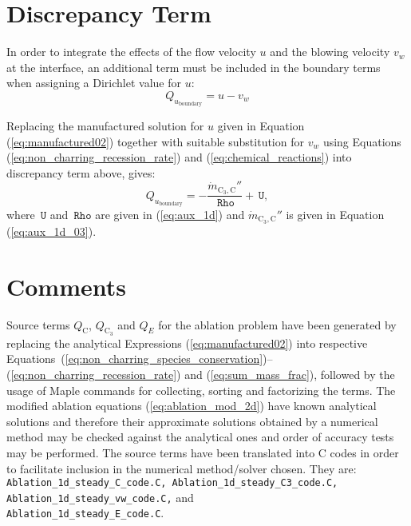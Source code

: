 \documentclass[10pt]{article}
\newcommand{\Rho}{\,\mathtt{Rho}}
\newcommand{\U}{\,\mathtt{U}}
\newcommand{\C}{\text{C}}
\begin{document}
\section{Discrepancy Term}

In order to integrate the effects of the flow velocity $u$ and the blowing velocity $v_w$ at the interface, an additional term must be included in the boundary terms when assigning a Dirichlet value for $u$:
\begin{equation}\label{eq:discrepancy}
 Q_{u_\text{boundary}} = u - v_w
\end{equation}

Replacing the manufactured solution for $u$ given in Equation (\ref{eq:manufactured02}) together with suitable substitution for $v_w$ using Equations (\ref{eq:non_charring_recession_rate}) and (\ref{eq:chemical_reactions}) into discrepancy term above, gives:
\begin{equation}
 Q_{u_\text{boundary}} = -\dfrac{\dot{m}_{\C_3,\C}''}{ \Rho} + \U,
\end{equation}
where $\U$ and $\Rho$ are given in (\ref{eq:aux_1d}) and $\dot{m}_{\C_3,\C}''$ is  given in Equation (\ref{eq:aux_1d_03}).

\section{Comments}


Source terms $Q_{\C}$, $Q_{\C_3}$  and $Q_E$ for the ablation problem have been generated by replacing the analytical Expressions (\ref{eq:manufactured02}) into respective Equations~(\ref{eq:non_charring_species_conservation})--(\ref{eq:non_charring_recession_rate}) and (\ref{eq:sum_mass_frac}), followed by the usage of Maple commands for collecting, sorting and factorizing the terms. 
The modified ablation equations (\ref{eq:ablation_mod_2d}) have known analytical solutions and therefore their approximate  solutions obtained by a numerical method may be checked against the analytical ones and order of accuracy tests may be performed.
The source terms have been translated into C codes in order to facilitate inclusion in the numerical method/solver chosen.  They are: \texttt{ Ablation\_1d\_steady\_C\_code.C, Ablation\_1d\_steady\_C3\_code.C, Ablation\_1d\_steady\_vw\_code.C,} and\\ \texttt{Ablation\_1d\_steady\_E\_code.C}. 
\end{document}
